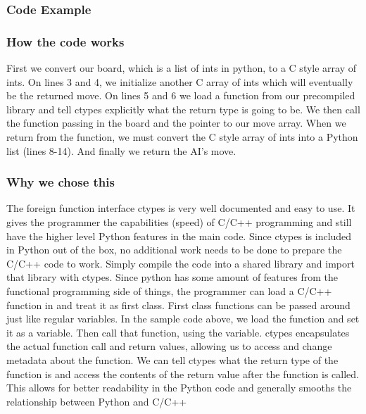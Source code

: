 \documentclass[12pt]{article}
\begin{document}
        \subsubsection{Code Example}
            
        \subsubsection{How the code works}
            First we convert our board, which is a list of ints in python, to a C style array
            of ints. On lines 3 and 4, we initialize another C array of ints which will eventually
            be the returned move. On lines 5 and 6 we load a function from our precompiled library
            and tell ctypes explicitly what the return type is going to be. We then call the function
            passing in the board and the pointer to our move array. When we return from the function,
            we must convert the C style array of ints into a Python list (lines 8-14). And finally
            we return the AI's move.
        \subsubsection{Why we chose this}
            The foreign function interface ctypes is very well documented and easy to use.
            It gives the programmer the capabilities (speed) of C/C++ programming
            and still have the higher level Python features in the main code. Since ctypes
            is included in Python out of the box, no additional work needs to be done to prepare
            the C/C++ code to work. Simply compile the code into a shared library and import that
            library with ctypes. Since python has some amount of features from the functional
            programming side of things, the programmer can load a C/C++ function in and treat it
            as first class. First class functions can be passed around just like regular variables.
            In the sample code above, we load the function and set it as a variable. Then call that
            function, using the variable. ctypes encapsulates the actual function call and return
            values, allowing us to access and change metadata about the function. We can tell ctypes
            what the return type of the function is and access the contents of the return value after
            the function is called. This allows for better readability in the Python code and
            generally smooths the relationship between Python and C/C++
            
\end{document}
